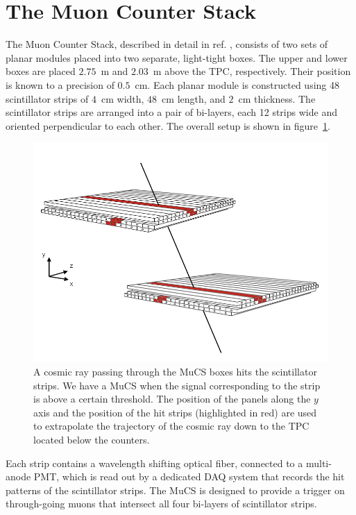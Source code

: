 \documentclass[a4paper,11pt]{article}
\begin{document}
\section{The Muon Counter Stack}\label{sec:proc}
The Muon Counter Stack, described in detail in ref. \cite{mucs}, consists of two sets of planar modules placed into two separate, light-tight boxes. The upper and lower boxes are placed $2.75$~m and $2.03$~m above the TPC, respectively. Their position is known to a precision of $0.5$~cm. Each planar module is constructed using 48 scintillator strips of $4$~cm width, $48$~cm length, and $2$~cm thickness. The scintillator strips are arranged into a pair of bi-layers, each 12 strips wide and oriented perpendicular to each other. The overall setup is shown in figure~\ref{fig:boxes}.

\begin{figure}[htbp]
  \begin{center}
    \includegraphics[width=0.7\linewidth]{figures/boxes.png}
    \caption{A cosmic ray passing through the MuCS boxes hits the scintillator strips. We have a MuCS when the signal corresponding to the strip is above a certain threshold. The position of the panels along the $y$ axis and the position of the hit strips (highlighted in red) are used to extrapolate the trajectory of the cosmic ray down to the TPC located below the counters.} \label{fig:boxes}
  \end{center}
\end{figure}

Each strip contains a wavelength shifting optical fiber, connected to a multi-anode PMT, which is read out by a dedicated DAQ system that records the hit patterns of the scintillator strips.
The MuCS is designed to provide a trigger on through-going muons that intersect all four bi-layers of scintillator strips.
\end{document}
